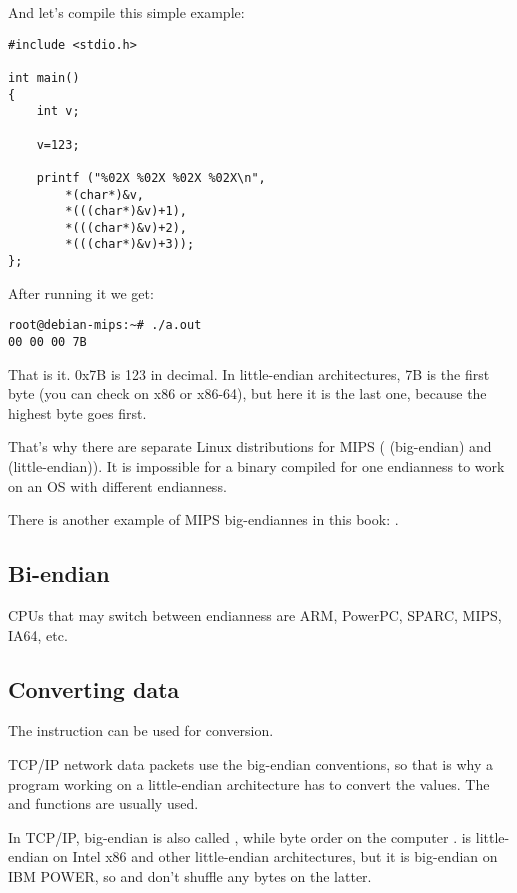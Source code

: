 And let's compile this simple example:

\begin{lstlisting}[style=customc]
#include <stdio.h>

int main()
{
	int v;

	v=123;

	printf ("%02X %02X %02X %02X\n", 
		*(char*)&v,
		*(((char*)&v)+1),
		*(((char*)&v)+2),
		*(((char*)&v)+3));
};
\end{lstlisting}

After running it we get:

\begin{lstlisting}
root@debian-mips:~# ./a.out 
00 00 00 7B
\end{lstlisting}

That is it.
0x7B is 123 in decimal.
In little-endian architectures, 7B is the first byte (you can check on x86 or x86-64), 
but here it is the last one, because the highest byte goes first.

That's why there are separate Linux distributions for MIPS
( (big-endian) and  (little-endian)).
It is impossible for a binary compiled for one endianness to work on an \ac{OS} with different endianness. 

There is another example of MIPS big-endiannes in this book: .

\subsection{Bi-endian}

CPUs that may switch between endianness are ARM, PowerPC, SPARC, MIPS, \ac{IA64}, etc.

\subsection{Converting data}

The  instruction can be used for conversion.

TCP/IP network data packets use the big-endian conventions, so that is why a program working on a little-endian architecture
has to convert the values.
The  and  functions are usually used.

In TCP/IP, big-endian is also called , while byte order on the computer .
 is little-endian on Intel x86 and other little-endian architectures,
but it is big-endian on IBM POWER, so  and  don't shuffle any bytes on the latter.

